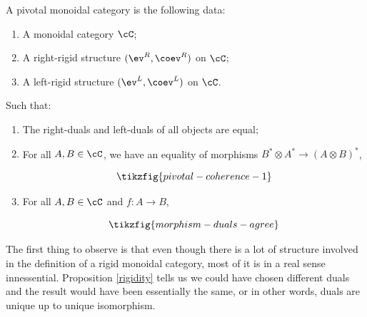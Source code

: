 \begin{defn} A pivotal monoidal category is the following data:

\begin{enumerate}
\item A monoidal category $\cC$;
\item A right-rigid structure $(\ev^R, \coev^R)$ on $\cC$;
\item A left-rigid structure $(\ev^L, \coev^L)$ on $\cC$.
\end{enumerate}

Such that:

\begin{enumerate}
\item The right-duals and left-duals of all objects are equal;
\item For all $A,B\in \cC$, we have an equality of morphisms $B^*\otimes A^*\xrightarrow{} (A\otimes B)^*$,

\begin{equation*}
\tikzfig{pivotal-coherence-1}
\end{equation*}

\item For all $A,B\in \cC$ and $f:A\to B$,

\begin{equation*}
\tikzfig{morphism-duals-agree}
\end{equation*}
\end{enumerate}


\end{defn}

\begin{rem}
The first thing to observe is that even though there is a lot of structure involved in the definition of a rigid monoidal category, most of it is in a real sense innessential. Proposition \ref{rigidity} tells us we could have chosen different duals and the result would have been essentially the same, or in other words, duals are unique up to unique isomorphism.
\end{rem}

